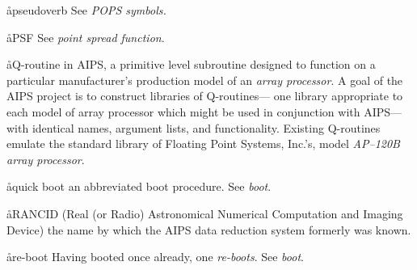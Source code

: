 \aa{pseudoverb} See {\it POPS symbols.}

\aa{PSF} See {\it point spread function}.

\aa{Q-routine}
in AIPS, a primitive level subroutine designed to function on a
particular manufacturer's production model of an {\it array processor}.
A goal of the AIPS project is to construct libraries of Q-routines---%
one library appropriate to each model of array processor which might
be used in conjunction with AIPS---%
with identical names, argument lists, and functionality.
Existing Q-routines emulate the standard library of Floating Point
Systems, Inc.'s, model {\it AP--120B array processor}.

\aa{quick boot} an abbreviated boot procedure.  See {\it boot}.

\aa{RANCID}
(Real (or Radio) Astronomical Numerical Computation and Imaging Device)
the name by which the AIPS data reduction system formerly was known.

\aa{re-boot}
Having booted once already, one {\it re-boots}.  See {\it boot}.


